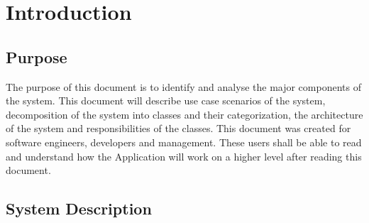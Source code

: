 \documentclass[english]{article}
\begin{document}
\vspace*{\fill} 
\vspace*{\fill} 

\newpage

\tableofcontents

\newpage

\setcounter{page}{1}
\raggedright    

\section{Introduction}
\label{sec:introduction}

\subsection{Purpose}
\label{sub:purpose}
The purpose of this document is to identify and analyse the major components of the system. This document will describe use case scenarios of the system, decomposition of the system into classes and their categorization, the architecture of the system and responsibilities of the classes. This document was created for software engineers, developers and management. These users shall be able to read and understand how the Application will work on a higher level after reading this document.

\subsection{System Description}
\label{sub:system_description}
\end{document}
